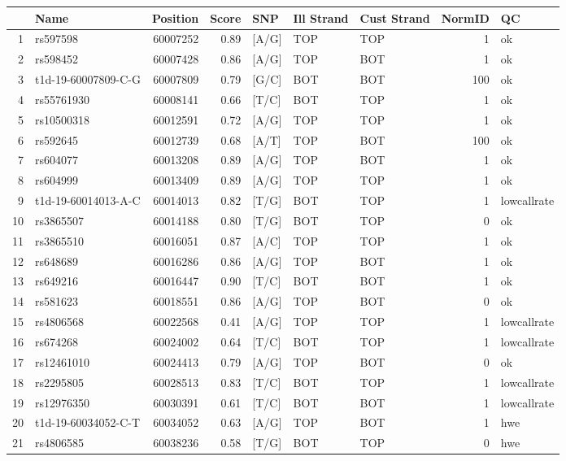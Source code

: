 \documentclass[12pt,a4paper,twoside]{article}
\begin{document}
\begin{table}[h]
\begin{center}
\footnotesize
\begin{tabular}{rlrrlllrl}
  \hline
 & Name & Position & Score & SNP & Ill Strand & Cust Strand & NormID & QC \\ 
  \hline
  1 & rs597598 & 60007252 & 0.89 & [A/G] & TOP & TOP &   1 & ok \\ 
  2 & rs598452 & 60007428 & 0.86 & [A/G] & TOP & BOT &   1 & ok \\ 
  3 & t1d-19-60007809-C-G & 60007809 & 0.79 & [G/C] & BOT & BOT & 100 & ok \\ 
  4 & rs55761930 & 60008141 & 0.66 & [T/C] & BOT & TOP &   1 & ok \\ 
  5 & rs10500318 & 60012591 & 0.72 & [A/G] & TOP & TOP &   1 & ok \\ 
  6 & rs592645 & 60012739 & 0.68 & [A/T] & TOP & BOT & 100 & ok \\ 
  7 & rs604077 & 60013208 & 0.89 & [A/G] & TOP & BOT &   1 & ok \\ 
  8 & rs604999 & 60013409 & 0.89 & [A/G] & TOP & TOP &   1 & ok \\ 
  9 & t1d-19-60014013-A-C & 60014013 & 0.82 & [T/G] & BOT & TOP &   1 & lowcallrate \\ 
  10 & rs3865507 & 60014188 & 0.80 & [T/G] & BOT & TOP &   0 & ok \\ 
  11 & rs3865510 & 60016051 & 0.87 & [A/C] & TOP & TOP &   1 & ok \\ 
  12 & rs648689 & 60016286 & 0.86 & [A/G] & TOP & BOT &   1 & ok \\ 
  13 & rs649216 & 60016447 & 0.90 & [T/C] & BOT & BOT &   1 & ok \\ 
  14 & rs581623 & 60018551 & 0.86 & [A/G] & TOP & BOT &   0 & ok \\ 
  15 & rs4806568 & 60022568 & 0.41 & [A/G] & TOP & TOP &   1 & lowcallrate \\ 
  16 & rs674268 & 60024002 & 0.64 & [T/C] & BOT & TOP &   1 & lowcallrate \\ 
  17 & rs12461010 & 60024413 & 0.79 & [A/G] & TOP & BOT &   0 & ok \\ 
  18 & rs2295805 & 60028513 & 0.83 & [T/C] & BOT & TOP &   1 & lowcallrate \\ 
  19 & rs12976350 & 60030391 & 0.61 & [T/C] & BOT & BOT &   1 & lowcallrate \\ 
  20 & t1d-19-60034052-C-T & 60034052 & 0.63 & [A/G] & TOP & BOT &   1 & hwe \\ 
  21 & rs4806585 & 60038236 & 0.58 & [T/G] & BOT & TOP &   0 & hwe \\ 

\end{tabular}
\end{center}
\end{table}
\end{document}
